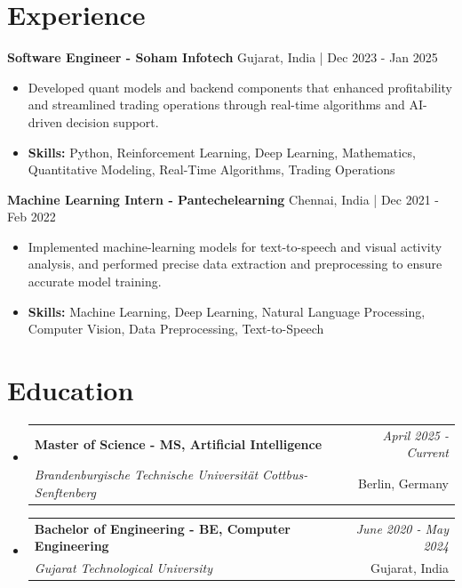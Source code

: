 \documentclass[a4paper,11pt]{article}
\makeatletter
\newcommand{\resumeSubheading}[4]{
\vspace{0.5mm}\item
    \begin{tabular*}{0.98\textwidth}[t]{l@{\extracolsep{\fill}}r}
        \textbf{#1} & \textit{\footnotesize{#4}} \\
        \textit{\footnotesize{#3}} &  \footnotesize{#2}\\
    \end{tabular*}
    \vspace{-2.4mm}
}
\makeatother
\begin{document}
\section{\textbf{Experience}}


\vspace{1mm}
  \textbf{Software Engineer - Soham Infotech} \hfill Gujarat, India | Dec 2023 - Jan 2025
\vspace{-1.5mm} %
\begin{itemize}
  \item Developed quant models and backend components that enhanced profitability and streamlined trading operations through real-time algorithms and AI-driven decision support.

\vspace{-2mm}
  \item \textbf{Skills:} Python, Reinforcement Learning, Deep Learning, Mathematics, Quantitative Modeling, Real-Time Algorithms, Trading Operations
\end{itemize}

\vspace{1mm}
  \textbf{Machine Learning Intern - Pantechelearning} \hfill Chennai, India | Dec 2021 - Feb 2022
\vspace{-1.5mm} %
\begin{itemize}
  \item Implemented machine-learning models for text-to-speech and visual activity analysis, and performed precise data extraction and preprocessing to ensure accurate model training.
\vspace{-2mm}
  \item \textbf{Skills:} Machine Learning, Deep Learning, Natural Language Processing, Computer Vision, Data Preprocessing, Text-to-Speech
\end{itemize}\section{\textbf{Education}}
\vspace{-0.4mm}

\begin{itemize}
\resumeSubheading
{Master of Science - MS, Artificial Intelligence }{Berlin, Germany}
{Brandenburgische Technische Universität Cottbus-Senftenberg  }{April 2025 - Current}

\vspace{1.0mm} %
\resumeSubheading
{Bachelor of Engineering - BE, Computer Engineering  }{Gujarat, India}
{Gujarat Technological University }{June 2020 - May 2024}

\end{itemize}
\end{document}
